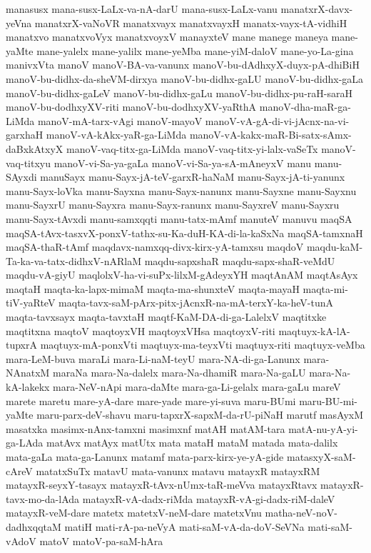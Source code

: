 {manasusx
mana-susx-LaLx-va-nA-darU
mana-susx-LaLx-vanu
manatxrX-davx-yeVna
manatxrX-vaNoVR
manatxvayx
manatxvayxH
manatx-vayx-tA-vidhiH
manatxvo
manatxvoVyx
manatxvoyxV
manayxteV
mane
manege
maneya
mane-yaMte
mane-yalelx
mane-yalilx
mane-yeMba
mane-yiM-daloV
mane-yo-La-gina
manivxVta
manoV
manoV-BA-va-vanunx
manoV-bu-dAdhxyX-duyx-pA-dhiBiH
manoV-bu-didhx-da-sheVM-dirxya
manoV-bu-didhx-gaLU
manoV-bu-didhx-gaLa
manoV-bu-didhx-gaLeV
manoV-bu-didhx-gaLu
manoV-bu-didhx-pu-raH-saraH
manoV-bu-dodhxyXV-riti
manoV-bu-dodhxyXV-yaRthA
manoV-dha-maR-ga-LiMda
manoV-mA-tarx-vAgi
manoV-mayoV
manoV-vA-gA-di-vi-jAcnx-na-vi-garxhaH
manoV-vA-kAkx-yaR-ga-LiMda
manoV-vA-kakx-maR-Bi-satx-sAmx-daBxkAtxyX
manoV-vaq-titx-ga-LiMda
manoV-vaq-titx-yi-lalx-vaSeTx
manoV-vaq-titxyu
manoV-vi-Sa-ya-gaLa
manoV-vi-Sa-ya-sA-mAneyxV
manu
manu-SAyxdi
manuSayx
manu-Sayx-jA-teV-garxR-haNaM
manu-Sayx-jA-ti-yanunx
manu-Sayx-loVka
manu-Sayxna
manu-Sayx-nanunx
manu-Sayxne
manu-Sayxnu
manu-SayxrU
manu-Sayxra
manu-Sayx-ranunx
manu-SayxreV
manu-Sayxru
manu-Sayx-tAvxdi
manu-samxqqti
manu-tatx-mAmf
manuteV
manuvu
maqSA
maqSA-tAvx-tasxvX-ponxV-tathx-su-Ka-duH-KA-di-la-kaSxNa
maqSA-tamxnaH
maqSA-thaR-tAmf
maqdavx-namxqq-divx-kirx-yA-tamxsu
maqdoV
maqdu-kaM-Ta-ka-va-tatx-didhxV-nARlaM
maqdu-sapxshaR
maqdu-sapx-shaR-veMdU
maqdu-vA-giyU
maqlolxV-ha-vi-suPx-lilxM-gAdeyxYH
maqtAnAM
maqtAsAyx
maqtaH
maqta-ka-lapx-mimaM
maqta-ma-shunxteV
maqta-mayaH
maqta-mi-tiV-yaRteV
maqta-tavx-saM-pArx-pitx-jAcnxR-na-mA-terxY-ka-heV-tunA
maqta-tavxsayx
maqta-tavxtaH
maqtf-KaM-DA-di-ga-LalelxV
maqtitxke
maqtitxna
maqtoV
maqtoyxVH
maqtoyxVHsa
maqtoyxV-riti
maqtuyx-kA-lA-tupxrA
maqtuyx-mA-ponxVti
maqtuyx-ma-teyxVti
maqtuyx-riti
maqtuyx-veMba
mara-LeM-buva
maraLi
mara-Li-naM-teyU
mara-NA-di-ga-Lanunx
mara-NAnatxM
maraNa
mara-Na-dalelx
mara-Na-dhamiR
mara-Na-gaLU
mara-Na-kA-lakekx
mara-NeV-nApi
mara-daMte
mara-ga-Li-gelalx
mara-gaLu
mareV
marete
maretu
mare-yA-dare
mare-yade
mare-yi-suva
maru-BUmi
maru-BU-mi-yaMte
maru-parx-deV-shavu
maru-tapxrX-sapxM-da-rU-piNaH
marutf
masAyxM
masatxka
masimx-nAnx-tamxni
masimxnf
matAH
matAM-tara
matA-nu-yA-yi-ga-LAda
matAvx
matAyx
matUtx
mata
mataH
mataM
matada
mata-dalilx
mata-gaLa
mata-ga-Lanunx
matamf
mata-parx-kirx-ye-yA-gide
matasxyX-saM-cAreV
matatxSuTx
matavU
mata-vanunx
matavu
matayxR
matayxRM
matayxR-seyxY-tasayx
matayxR-tAvx-nUmx-taR-meVva
matayxRtavx
matayxR-tavx-mo-da-lAda
matayxR-vA-dadx-riMda
matayxR-vA-gi-dadx-riM-daleV
matayxR-veM-dare
matetx
matetxV-neM-dare
matetxVnu
matha-neV-noV-dadhxqqtaM
matiH
mati-rA-pa-neVyA
mati-saM-vA-da-doV-SeVNa
mati-saM-vAdoV
matoV
matoV-pa-saM-hAra
}
